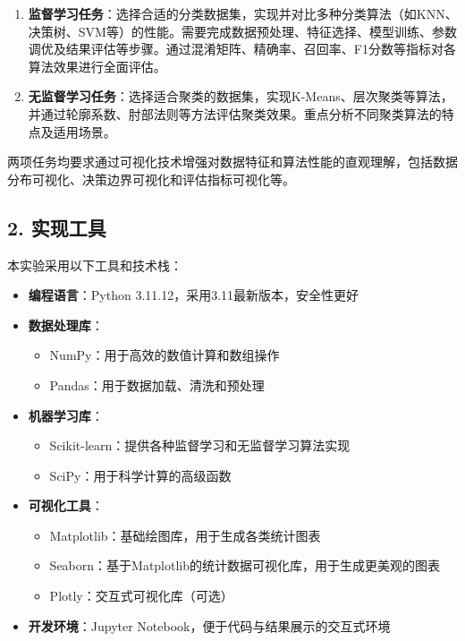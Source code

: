 \documentclass[UTF8]{ctexart}
\begin{document}
\begin{enumerate}
  \item \textbf{监督学习任务}：选择合适的分类数据集，实现并对比多种分类算法（如KNN、决策树、SVM等）的性能。需要完成数据预处理、特征选择、模型训练、参数调优及结果评估等步骤。通过混淆矩阵、精确率、召回率、F1分数等指标对各算法效果进行全面评估。
  
  \item \textbf{无监督学习任务}：选择适合聚类的数据集，实现K-Means、层次聚类等算法，并通过轮廓系数、肘部法则等方法评估聚类效果。重点分析不同聚类算法的特点及适用场景。
\end{enumerate}

两项任务均要求通过可视化技术增强对数据特征和算法性能的直观理解，包括数据分布可视化、决策边界可视化和评估指标可视化等。

\subsection*{2. 实现工具}
本实验采用以下工具和技术栈：

\begin{itemize}
  \item \textbf{编程语言}：Python 3.11.12，采用3.11最新版本，安全性更好
  
  \item \textbf{数据处理库}：
    \begin{itemize}
      \item NumPy：用于高效的数值计算和数组操作
      \item Pandas：用于数据加载、清洗和预处理
    \end{itemize}
  
  \item \textbf{机器学习库}：
    \begin{itemize}
      \item Scikit-learn：提供各种监督学习和无监督学习算法实现
      \item SciPy：用于科学计算的高级函数
    \end{itemize}
  
  \item \textbf{可视化工具}：
    \begin{itemize}
      \item Matplotlib：基础绘图库，用于生成各类统计图表
      \item Seaborn：基于Matplotlib的统计数据可视化库，用于生成更美观的图表
      \item Plotly：交互式可视化库（可选）
    \end{itemize}
    
  \item \textbf{开发环境}：Jupyter Notebook，便于代码与结果展示的交互式环境
\end{itemize}
\end{document}
